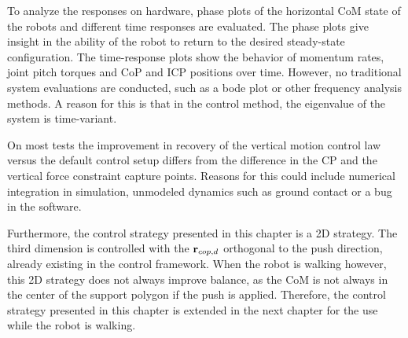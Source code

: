To analyze the responses on hardware, phase plots of the horizontal \ac{CoM} state of the robots and different time responses are evaluated. The phase plots give insight in the ability of the robot to return to the desired steady-state configuration. The time-response plots show the behavior of momentum rates, joint pitch torques and \ac{CoP} and \ac{ICP} positions over time. However, no traditional system evaluations are conducted, such as a bode plot or other frequency analysis methods. A reason for this is that in the control method, the eigenvalue of the system is time-variant.

On most tests the improvement in recovery of the vertical motion control law versus the default control setup differs  from the difference in the \ac{CP} and the vertical force constraint capture points. Reasons for this could include numerical integration in simulation, unmodeled dynamics such as ground contact or a bug in the software.

Furthermore, the control strategy presented in this chapter is a \ac{2D} strategy. The third dimension is controlled with the $\mathbf{r}_{cop,d}$ orthogonal to the push direction, already existing in the control framework. When the robot is walking however, this \ac{2D} strategy does not always improve balance, as the \ac{CoM} is not always in the center of the support polygon if the push is applied. Therefore, the control strategy presented in this chapter is extended in the next chapter for the use while the robot is walking.




